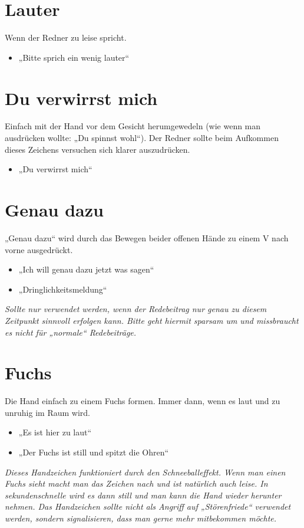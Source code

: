 \documentclass{neulingsheft}
\begin{document}
{\section{Lauter}
Wenn der Redner zu leise spricht.
\begin{itemize}
	\item „Bitte sprich ein wenig lauter“
\end{itemize}

\section{Du verwirrst mich}
Einfach mit der Hand vor dem Gesicht herumgewedeln (wie wenn man ausdrücken
wollte: „Du spinnst wohl“). Der Redner sollte beim Aufkommen dieses Zeichens
versuchen sich klarer auszudrücken.
\begin{itemize}
	\item „Du verwirrst mich“
\end{itemize}

\section{Genau dazu} %
„Genau dazu“ wird durch das Bewegen beider offenen Hände zu einem V nach vorne
ausgedrückt.
\begin{itemize}
	\item „Ich will genau dazu jetzt was sagen“
	\item „Dringlichkeitsmeldung“
\end{itemize}
\emph{Sollte nur verwendet werden, wenn der Redebeitrag nur genau zu diesem
Zeitpunkt sinnvoll erfolgen kann. Bitte geht hiermit sparsam um und missbraucht
es nicht für „normale“ Redebeiträge.}

\section{Fuchs} %
Die Hand einfach zu einem Fuchs formen. Immer dann, wenn es laut und zu unruhig
im Raum wird.
\begin{itemize}
	\item „Es ist hier zu laut“
	\item „Der Fuchs ist still und spitzt die Ohren“
\end{itemize}
\emph{Dieses Handzeichen funktioniert durch den Schneeballeffekt. Wenn man
einen Fuchs sieht macht man das Zeichen nach und ist natürlich auch leise. In
sekundenschnelle wird es dann still und man kann die Hand wieder herunter
nehmen. Das Handzeichen sollte nicht als Angriff auf „Störenfriede“ verwendet
werden, sondern signalisieren, dass man gerne mehr mitbekommen möchte.}

}
\end{document}
